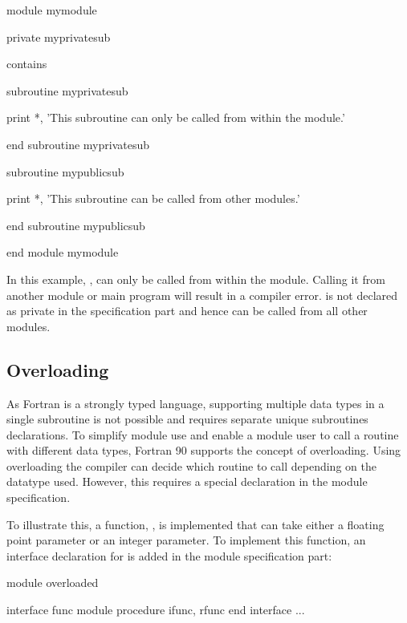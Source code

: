 \begin{fortrancodeenv}
module mymodule

	private myprivatesub
	
contains

	subroutine myprivatesub
	
		print *, 'This subroutine can only be called from within the module.'
	
	end subroutine myprivatesub
	
	subroutine mypublicsub
	
		print *, 'This subroutine can be called from other modules.'
	
	end subroutine mypublicsub
	
end module mymodule
\end{fortrancodeenv}

In this example, , can only be called from within the module. Calling it from another module or main program will result in a compiler error.  is not declared as private in the specification part and hence can be called from all other modules.

\subsection{Overloading}

As Fortran is a strongly typed language, supporting multiple data types in a single subroutine is not possible and requires separate unique subroutines declarations. To simplify module use and enable a module user to call a routine with different data types, Fortran 90 supports the concept of overloading. Using overloading the compiler can decide which routine to call depending on the datatype used. However, this requires a special declaration in the module specification.

To illustrate this, a function, , is implemented that can take either a floating point parameter or an integer parameter. To implement this function, an interface declaration for  is added in the module specification part:

\begin{fortrancodeenv}
module overloaded

	interface func
		module procedure ifunc, rfunc
	end interface
	...
\end{fortrancodeenv}


